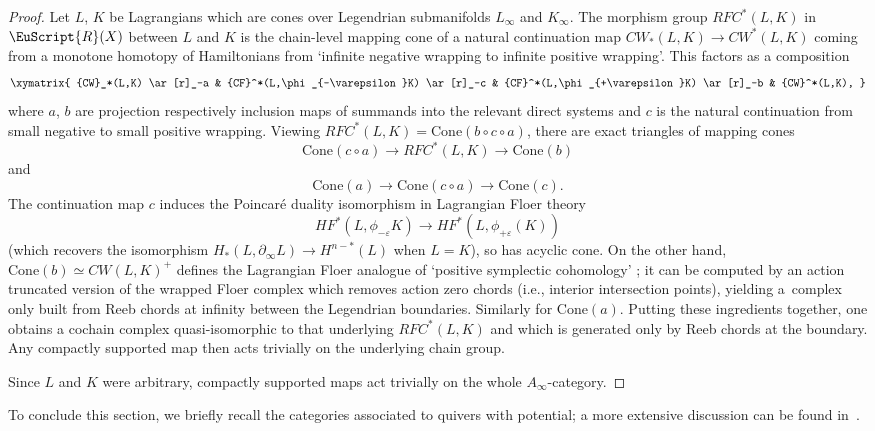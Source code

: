 \documentclass[10pt,a4paper]{amsart}
\def\scrR{\EuScript{R}}
\theoremstyle{definition}
\numberwithin{equation}{section}
\begin{document}
\begin{proof}
Let $L$, $K$ be Lagrangians which are cones over Legendrian submanifolds $L_{\infty}$ and $K_{\infty}$.
The morphism group ${RFC}^*(L,K)$ in $\scrR(X)$ between $L$ and $K$ is the chain-level mapping cone of a natural continuation map ${CW}_*(L,K) \to {CW}^*(L,K)$ coming from a monotone homotopy of Hamiltonians from `infinite negative wrapping to infinite positive wrapping'. This factors as a composition
\[
\xymatrix{
{CW}_*(L,K) \ar[r]_-a & {CF}^*(L,\phi_{-\varepsilon}K) \ar[r]_-c &
{CF}^*(L,\phi_{+\varepsilon}K) \ar[r]_-b & {CW}^*(L,K),
}
\]
where $a$, $b$ are projection respectively inclusion maps of summands into the relevant direct systems and $c$ is the natural continuation from small negative to small positive wrapping. Viewing ${RFC}^*(L,K) = \mathrm{Cone}(b\circ c \circ a)$,
there are exact triangles of mapping cones
\[
\mathrm{Cone}(c\circ a) \to {RFC}^*(L,K) \to \mathrm{Cone}(b)
\]
and
\[
\mathrm{Cone}(a) \to \mathrm{Cone}(c\circ a) \to \mathrm{Cone}(c).
\]
The continuation map $c$ induces the Poincar\'e duality isomorphism in Lagrangian Floer theory
\[
HF^*(L,\phi_{-\varepsilon}K) \to HF^*(L,\phi_{+\varepsilon}(K))
\]
(which recovers the isomorphism $H_*(L,\partial_{\infty}L) \to H^{n-*}(L)$ when $L=K$),
so has acyclic cone. On the other hand, $\mathrm{Cone}(b) \simeq {CW}(L,K)^+$ defines the Lagrangian Floer analogue of `positive symplectic cohomology' \cite{Ritter}; it can be computed by an action truncated version of the wrapped Floer complex which removes action zero chords (i.e., interior intersection points), yielding a~complex only built from Reeb chords at infinity between the Legendrian boundaries. Similarly for $\mathrm{Cone}(a)$. Putting these ingredients together, one obtains a cochain complex quasi-isomorphic to that underlying ${RFC}^*(L,K)$ and which is generated only by Reeb chords at the boundary. Any compactly supported map then acts trivially on the underlying chain group.

 Since $L$ and $K$ were arbitrary, compactly supported maps act trivially on the whole $A_{\infty}$-category.
\end{proof}

To conclude this section, we briefly recall the categories associated to quivers with potential; a more extensive discussion can be found in~\cite{Smith:quiver}.
\end{document}
